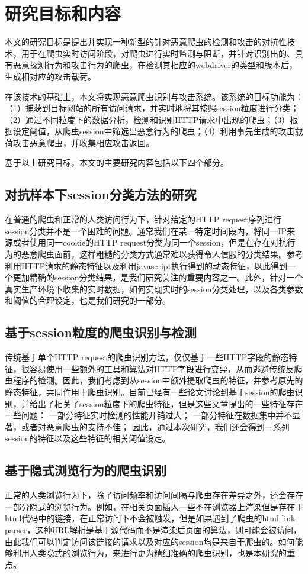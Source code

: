 \documentclass[doctor,privacy,twoside]{buaa_mac}
\begin{document}
\section{研究目标和内容}
本文的研究目标是提出并实现一种新型的针对恶意爬虫的检测和攻击的对抗性技术，用于在爬虫实时访问阶段，对爬虫进行实时监测与阻断，并针对识别出的、具有恶意探测行为和攻击行为的爬虫，在检测其相应的webdriver的类型和版本后，生成相对应的攻击载荷。

在该技术的基础上，本文将实现恶意爬虫识别与攻击系统。该系统的目标功能为：（1）捕获到目标网站的所有访问请求，并实时地将其按照session粒度进行分类；（2）通过不同粒度下的数据分析，检测和识别HTTP请求中出现的爬虫；（3）根据设定阈值，从爬虫session中筛选出恶意行为的爬虫；（4）利用事先生成的攻击载荷攻击恶意爬虫，并收集相应攻击返回。

基于以上研究目标，本文的主要研究内容包括以下四个部分。

\subsection{对抗样本下session分类方法的研究}
在普通的爬虫和正常的人类访问行为下，针对给定的HTTP request序列进行session分类并不是一个困难的问题。通常我们在某一特定时间段内，将同一IP来源或者使用同一cookie的HTTP request分类为同一个session，但是在存在对抗行为的恶意爬虫面前，这样粗糙的分类方式通常难以获得令人信服的分类结果。参考利用HTTP请求的静态特征以及利用javascript执行得到的动态特征，以此得到一个更加精确的session分类结果，是我们研究关注的重要内容之一。此外，针对一个真实生产环境下收集的实时数据，如何实现实时的session分类处理，以及各类参数和阈值的合理设定，也是我们研究的一部分。

\subsection{基于session粒度的爬虫识别与检测}
传统基于单个HTTP request的爬虫识别方法，仅仅基于一些HTTP字段的静态特征，很容易使用一些额外的工具和算法对HTTP字段进行变异，从而逃避传统反爬虫程序的检测。因此，我们考虑到从session中额外提取爬虫的特征，并参考原先的静态特征，共同作用于爬虫识别。目前已经有一些论文讨论到基于session的爬虫识别，并给出了相关了session粒度下的爬虫特征，但是这些文章提出的一些特征存在一些问题：
一部分特征实时检测的性能开销过大；
一部分特征在数据集中并不显著，或者对恶意爬虫的支持不佳；
因此，通过本次研究，我们还会得到一系列session的特征以及这些特征的相关阈值设定。

\subsection{基于隐式浏览行为的爬虫识别}
正常的人类浏览行为下，除了访问频率和访问间隔与爬虫存在差异之外，还会存在一部分隐式的浏览行为。例如，在相关页面插入一些不在浏览器上渲染但是存在于html代码中的链接，在正常访问下不会被触发，但是如果遇到了爬虫的html link parser，这种URL解析是基于源代码而不是渲染后页面的算法，则可能会被访问，由此我们可以判定访问该链接的请求以及对应的session均是来自于爬虫的。如何能够利用人类隐式的浏览行为，来进行更为精细准确的爬虫识别，也是本研究的重点。
\end{document}
